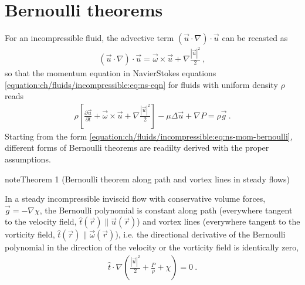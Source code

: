 \documentclass[letterpaper,10pt,english]{jupyterBook}
\begin{document}
\section{Bernoulli theorems}
\label{\detokenize{ch/fluids/incompressible:bernoulli-theorems}}\label{\detokenize{ch/fluids/incompressible:id1}}
\sphinxAtStartPar
For an incompressible fluid, the advective term \((\vec{u} \cdot \nabla) \cdot \vec{u}\) can be recasted as
\begin{equation*}
\begin{split}(\vec{u} \cdot \nabla) \cdot \vec{u} = \vec{\omega} \times \vec{u} + \nabla \frac{|\vec{u}|^2}{2} \ ,\end{split}
\end{equation*}
\sphinxAtStartPar
so that the momentum equation in Navier\sphinxhyphen{}Stokes equations \eqref{equation:ch/fluids/incompressible:eq:ns-eqn} for fluids with uniform density \(\rho\) reads
\begin{equation}\label{equation:ch/fluids/incompressible:eq:ns-mom-bernoulli}
\begin{split} \rho \left[ \frac{\partial \vec{u}}{\partial t} + \vec{\omega} \times \vec{u} + \nabla \frac{|\vec{u}|^2}{2} \right] - \mu \Delta \vec{u} + \nabla P = \rho \vec{g} \ .\end{split}
\end{equation}
\sphinxAtStartPar
Starting from the form \eqref{equation:ch/fluids/incompressible:eq:ns-mom-bernoulli}, different forms of Bernoulli theorems are readilty derived with the proper assumptions.
\label{ch/fluids/incompressible:theorem-0}
\begin{sphinxadmonition}{note}{Theorem 1 (Bernoulli theorem along path and vortex lines in steady flows)}



\sphinxAtStartPar
In a steady incompressible inviscid flow with conservative volume forces, \(\vec{g} = - \nabla \chi\), the Bernoulli polynomial is constant along path (everywhere tangent to the velocity field, \(\hat{t}(\vec{r}) \parallel \vec{u}(\vec{r})\)) and vortex lines (everywhere tangent to the vorticity field, \(\hat{t}(\vec{r}) \parallel \vec{\omega}(\vec{r})\)), i.e. the directional derivative of the Bernoulli polynomial in the direction of the velocity or the vorticity field is identically zero,
\begin{equation*}
\begin{split}\hat{t} \cdot \nabla \left( \frac{|\vec{u}|^2}{2} + \frac{P}{\rho} + \chi \right) = 0 \ .\end{split}
\end{equation*}\end{sphinxadmonition}
\end{document}

